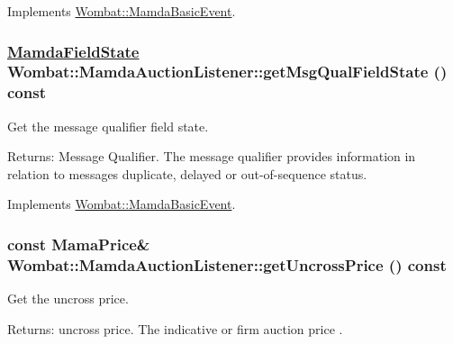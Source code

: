 Implements \hyperlink{classWombat_1_1MamdaBasicEvent_ff3932065e16e660fb6cd9285b46f7d0}{Wombat::Mamda\-Basic\-Event}.\hypertarget{classWombat_1_1MamdaAuctionListener_c70e8a3a46013d656e67750a2dc83fb4}{
\subsubsection[getMsgQualFieldState]{\setlength{\rightskip}{0pt plus 5cm}\hyperlink{namespaceWombat_93aac974f2ab713554fd12a1fa3b7d2a}{Mamda\-Field\-State} Wombat::Mamda\-Auction\-Listener::get\-Msg\-Qual\-Field\-State () const}}
\label{classWombat_1_1MamdaAuctionListener_c70e8a3a46013d656e67750a2dc83fb4}


Get the message qualifier field state. 

\begin{Desc}
\item[Returns:]Message Qualifier. The message qualifier provides information in relation to messages duplicate, delayed or out-of-sequence status. \end{Desc}


Implements \hyperlink{classWombat_1_1MamdaBasicEvent_3454d51e1131d9949691ee4b4153cd97}{Wombat::Mamda\-Basic\-Event}.\hypertarget{classWombat_1_1MamdaAuctionListener_d048e1fc8517df34c118245b89069da0}{
\subsubsection[getUncrossPrice]{\setlength{\rightskip}{0pt plus 5cm}const Mama\-Price\& Wombat::Mamda\-Auction\-Listener::get\-Uncross\-Price () const}}
\label{classWombat_1_1MamdaAuctionListener_d048e1fc8517df34c118245b89069da0}


Get the uncross price. 

\begin{Desc}
\item[Returns:]uncross price. The indicative or firm auction price . \end{Desc}



